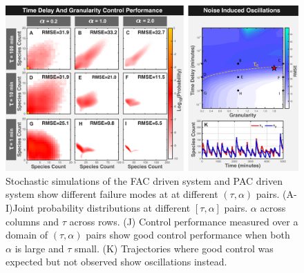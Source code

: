 \documentclass[12pt]{iopart}
\begin{document}

\begin{figure}
\begin{center}
\includegraphics[width=1\textwidth]{DelayAndGranularity.pdf}
\vspace{-0.1in}
\caption{Stochastic simulations of the FAC driven system and PAC driven system show different failure modes at at different $(\tau,\alpha)$ pairs. (A-I)Joint probability distributions at different $[\tau,\alpha]$ pairs. $\alpha$ across columns and $\tau$ across rows. (J) Control performance measured over a domain of $(\tau,\alpha)$ pairs show good control performance when both $\alpha$ is large and $\tau$ small. (K) Trajectories where good control was expected but not observed show oscillations instead.}
\label{DG}
\end{center}
\vspace{-0.2in}
\end{figure}
\end{document}
